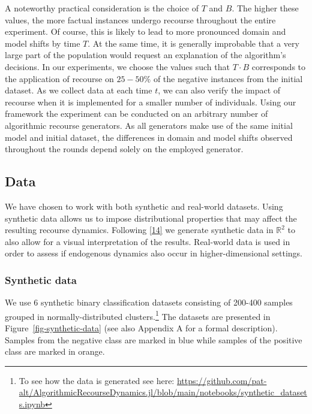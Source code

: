 \documentclass[
  conference]{IEEEtran}
\begin{document}
A noteworthy practical consideration is the choice of \(T\) and \(B\).
The higher these values, the more factual instances undergo recourse
throughout the entire experiment. Of course, this is likely to lead to
more pronounced domain and model shifts by time \(T\). At the same time,
it is generally improbable that a very large part of the population
would request an explanation of the algorithm's decisions. In our
experiments, we choose the values such that \(T \cdot B\) corresponds to
the application of recourse on \(25-50\%\) of the negative instances
from the initial dataset. As we collect data at each time \(t\), we can
also verify the impact of recourse when it is implemented for a smaller
number of individuals. Using our framework the experiment can be
conducted on an arbitrary number of algorithmic recourse generators. As
all generators make use of the same initial model and initial dataset,
the differences in domain and model shifts observed throughout the
rounds depend solely on the employed generator.

\hypertarget{sec-method-data}{%
\subsection{Data}\label{sec-method-data}}

We have chosen to work with both synthetic and real-world datasets.
Using synthetic data allows us to impose distributional properties that
may affect the resulting recourse dynamics. Following
\protect\hyperlink{ref-upadhyay2021towards}{{[}14{]}} we generate
synthetic data in \(\mathbb{R}^2\) to also allow for a visual
interpretation of the results. Real-world data is used in order to
assess if endogenous dynamics also occur in higher-dimensional settings.

\hypertarget{synthetic-data}{%
\subsubsection{Synthetic data}\label{synthetic-data}}

We use 6 synthetic binary classification datasets consisting of 200-400
samples grouped in normally-distributed clusters.\footnote{To see how
  the data is generated see here:
  \url{https://github.com/pat-alt/AlgorithmicRecourseDynamics.jl/blob/main/notebooks/synthetic_datasets.ipynb}}
The datasets are presented in Figure~\ref{fig-synthetic-data} (see also
Appendix A for a formal description). Samples from the negative class
are marked in blue while samples of the positive class are marked in
orange.
\end{document}
